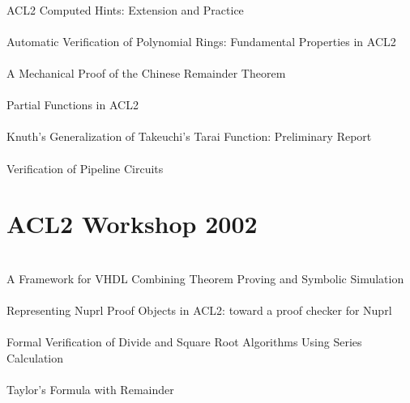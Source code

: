 \documentclass{article}
\begin{document}
\cite{00-sawada-computed} \\
ACL2 Computed Hints: Extension and Practice \\

\cite{00-bulo-polynomial} \\
Automatic Verification of Polynomial Rings: Fundamental Properties in ACL2 \\

\cite{00-russinoff-chinese} \\
A Mechanical Proof of the Chinese Remainder Theorem \\

\cite{00-manolios-partial} \\
Partial Functions in ACL2 \\

\cite{00-bailey-tarai} \\
Knuth's Generalization of Takeuchi's Tarai Function: Preliminary Report \\

\cite{00-kaufmann-pipeline} \\
Verification of Pipeline Circuits \\

\section{ACL2 Workshop 2002}

\cite{02-barrione-vhdl} \\
A Framework for VHDL Combining Theorem Proving and Symbolic Simulation \\

\cite{02-caldwell-nuprl} \\
Representing Nuprl Proof Objects in ACL2: toward a proof checker for Nuprl \\

\cite{02-sawada-sqrt} \\
Formal Verification of Divide and Square Root Algorithms Using Series Calculation \\

\cite{02-gamboa-taylor} \\
Taylor's Formula with Remainder \\
\end{document}
